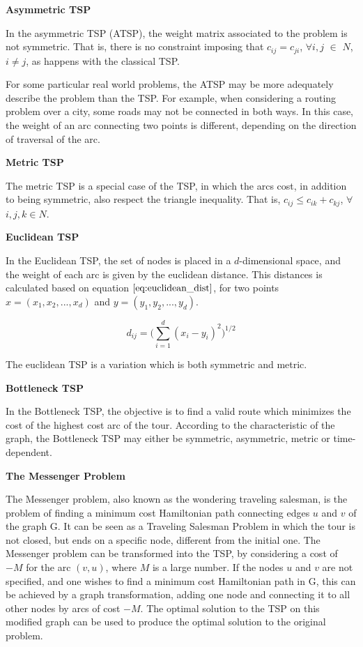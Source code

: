 \textbf{Asymmetric TSP}

In the asymmetric TSP (ATSP), the weight matrix associated to the problem is not symmetric. That is, there is no constraint imposing that $c_{ij} = c_{ji}$, $\forall i, j$ $\in$ $N$, $i \ne j$, as happens with the classical TSP.

For some particular real world problems, the ATSP may be more adequately describe the problem than the TSP. For example, when considering a routing problem over a city, some roads may not be connected in both ways. In this case, the weight of an arc connecting two points is different, depending on the direction of traversal of the arc.


\textbf{Metric TSP}

The metric TSP is a special case of the TSP, in which the arcs cost,
in addition to being symmetric, also respect the triangle inequality. That is,
$c_{ij} \leq c_{ik} + c_{kj}$, $\forall$ $i, j, k \in N$.


\textbf{Euclidean TSP}

In the Euclidean TSP, the set of nodes is placed in a $d$-dimensional space,
and the weight of each arc is given by the euclidean distance. This distances is
calculated based on equation $\ref{eq:euclidean_dist}$, for two points
$x = (x_{1}, x_{2}, ..., x_{d})$ and $y = (y_{1}, y_{2}, ..., y_{d})$.

\begin{equation}
\label{eq:euclidean_dist}
  d_{ij} = \bigg( \sum_{i=1}^{d} (x_{i}-y_{i})^2\bigg)^{1/2}
\end{equation}

The euclidean TSP is a variation which is both symmetric and metric.


\textbf{Bottleneck TSP}

In the Bottleneck TSP, the objective is to find a valid route which minimizes the cost of the highest cost arc of the tour. According to the characteristic of the graph,
the Bottleneck TSP may either be symmetric, asymmetric, metric or time-dependent.


\textbf{The Messenger Problem}

The Messenger problem, also known as the wondering traveling salesman, is the problem of finding a minimum cost Hamiltonian path connecting edges $u$ and $v$ of the graph G. It can be seen as a Traveling Salesman Problem in which the tour is not closed, but ends on a specific node, different from the initial one. The Messenger problem can be transformed into the TSP, by considering a cost of $-M$ for the arc $(v, u)$, where $M$ is a large number. If the nodes $u$ and $v$ are not specified, and one wishes to find a minimum cost Hamiltonian path in G, this can be achieved by a graph transformation, adding one node and connecting it to all other nodes by arcs of cost $-M$. The optimal solution to the TSP on this modified graph can be used to produce the optimal solution to the original problem.